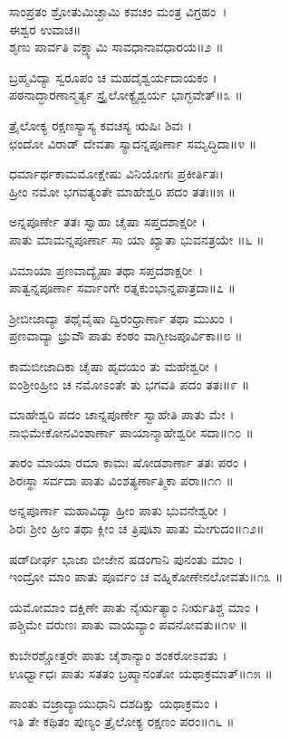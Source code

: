 ಸಾಂಪ್ರತಂ ಶ್ರೋತುಮಿಚ್ಛಾಮಿ ಕವಚಂ ಮಂತ್ರ ವಿಗ್ರಹಂ~।\\
ಈಶ್ವರ ಉವಾಚ॥\\
ಶೃಣು ಪಾರ್ವತಿ ವಕ್ಷ್ಯಾಮಿ ಸಾವಧಾನಾವಧಾರಯ॥೨ ॥

ಬ್ರಹ್ಮವಿದ್ಯಾ ಸ್ವರೂಪಂ ಚ ಮಹದೈಶ್ವರ್ಯದಾಯಕಂ ।\\
ಪಠನಾದ್ಧಾರಣಾನ್ಮರ್ತ್ಯ ಸ್ತ್ರೈಲೋಕ್ಯೈಶ್ವರ್ಯ ಭಾಗ್ಭವೇತ್॥೩ ॥

ತ್ರೈಲೋಕ್ಯ ರಕ್ಷಣಸ್ಯಾಸ್ಯ ಕವಚಸ್ಯ ಋಷಿಃ ಶಿವಃ ।\\
ಛಂದೋ ವಿರಾಡ್ ದೇವತಾ ಸ್ಯಾದನ್ನಪೂರ್ಣಾ ಸಮೃದ್ಧಿದಾ॥೪ ॥

ಧರ್ಮಾರ್ಥಕಾಮಮೋಕ್ಷೇಷು ವಿನಿಯೋಗಃ ಪ್ರಕೀರ್ತಿತಃ।\\
ಹ್ರೀಂ ನಮೋ ಭಗವತ್ಯಂತೇ ಮಾಹೇಶ್ವರಿ ಪದಂ ತತಃ॥೫ ॥

ಅನ್ನಪೂರ್ಣೇ ತತಃ ಸ್ವಾಹಾ ಚೈಷಾ ಸಪ್ತದಶಾಕ್ಷರೀ ।\\
ಪಾತು ಮಾಮನ್ನಪೂರ್ಣಾ ಸಾ ಯಾ ಖ್ಯಾತಾ ಭುವನತ್ರಯೇ ॥೬ ॥

ವಿಮಾಯಾ ಪ್ರಣವಾದ್ಯೈಷಾ ತಥಾ ಸಪ್ತದಶಾಕ್ಷರೀ~।\\
ಪಾತ್ವನ್ನಪೂರ್ಣಾ ಸರ್ವಾಂಗೇ ರತ್ನಕುಂಭಾನ್ನಪಾತ್ರದಾ॥೭ ॥

ಶ್ರೀಬೀಜಾದ್ಯಾ ತಥೈವೈಷಾ ದ್ವಿರಂಧ್ರಾರ್ಣಾ ತಥಾ ಮುಖಂ ।\\
ಪ್ರಣವಾದ್ಯಾ ಭ್ರುವೌ ಪಾತು ಕಂಠಂ ವಾಗ್ಬೀಜಪೂರ್ವಿಕಾ॥೮ ॥

ಕಾಮಬೀಜಾದಿಕಾ ಚೈಷಾ ಹೃದಯಂ ತು ಮಹೇಶ್ವರೀ ।\\
ಐಂಶ್ರೀಂಹ್ರೀಂ ಚ ನಮೋಽಂತೇ ತು ಭಗವತಿ ಪದಂ ತತಃ॥೯ ॥

ಮಾಹೇಶ್ವರಿ ಪದಂ ಚಾನ್ನಪೂರ್ಣೇ ಸ್ವಾಹೇತಿ ಪಾತು ಮೇ ।\\
ನಾಭಿಮೇಕೋನವಿಂಶಾರ್ಣಾ ಪಾಯಾನ್ಮಾಹೇಶ್ವರೀ ಸದಾ॥೧೦ ॥

ತಾರಂ ಮಾಯಾ ರಮಾ ಕಾಮಃ ಷೋಡಶಾರ್ಣಾ ತತಃ ಪರಂ ।\\
ಶಿರಃಸ್ಥಾ ಸರ್ವದಾ ಪಾತು ವಿಂಶತ್ಯರ್ಣಾತ್ಮಿಕಾ ಪರಾ॥೧೧ ॥

ಅನ್ನಪೂರ್ಣಾ ಮಹಾವಿದ್ಯಾ ಹ್ರೀಂ ಪಾತು ಭುವನೇಶ್ವರೀ ।\\
ಶಿರಃ ಶ್ರೀಂ ಹ್ರೀಂ ತಥಾ ಕ್ಲೀಂ ಚ ತ್ರಿಪುಟಾ ಪಾತು ಮೇಗುದಂ॥೧೨॥

ಷಡ್‌ದೀರ್ಘ ಭಾಜಾ ಬೀಜೇನ ಷಡಂಗಾನಿ ಪುನಂತು ಮಾಂ ।\\
ಇಂದ್ರೋ ಮಾಂ ಪಾತು ಪೂರ್ವಂ ಚ ವಹ್ನಿಕೋಣೇನಲೋವತು॥೧೩ ॥

ಯಮೋಮಾಂ ದಕ್ಷಿಣೇ ಪಾತು ನೈರ್ಋತ್ಯಾಂ ನಿರ್ಋತಿಶ್ಚ ಮಾಂ ।\\
ಪಶ್ಚಿಮೇ ವರುಣಃ ಪಾತು ವಾಯವ್ಯಾಂ ಪವನೋವತು॥೧೪ ॥

ಕುಬೇರಶ್ಚೋತ್ತರೇ ಪಾತು ಚೈಶಾನ್ಯಾಂ ಶಂಕರೋಽವತು ।\\
ಊರ್ಧ್ವಾಧಃ ಪಾತು ಸತತಂ ಬ್ರಹ್ಮಾನಂತೋ ಯಥಾಕ್ರಮಾತ್॥೧೫ ॥

ಪಾಂತು ವಜ್ರಾದ್ಯಾಯುಧಾನಿ ದಶದಿಕ್ಷು ಯಥಾಕ್ರಮಂ ।\\
ಇತಿ ತೇ ಕಥಿತಂ ಪುಣ್ಯಂ ತ್ರೈಲೋಕ್ಯ ರಕ್ಷಣಂ ಪರಂ॥೧೬ ॥

